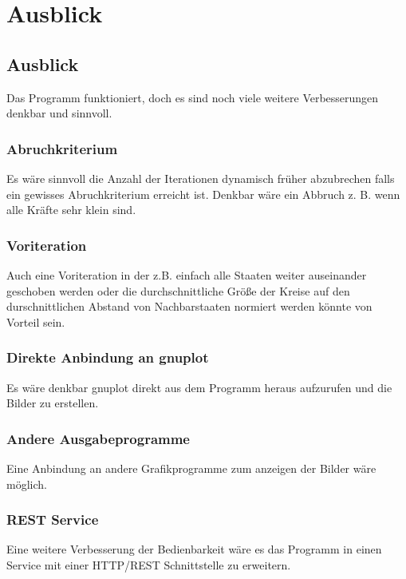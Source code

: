 \chapter{Ausblick}
\label{chap:ZusammenfassungAusblick}

\section{Ausblick}

Das Programm funktioniert, doch es sind noch viele weitere Verbesserungen denkbar und sinnvoll.

\subsection{Abruchkriterium}

Es wäre sinnvoll die Anzahl der Iterationen dynamisch früher abzubrechen falls ein gewisses Abruchkriterium erreicht ist.
Denkbar wäre ein Abbruch z. B. wenn alle Kräfte sehr klein sind.

\subsection{Voriteration}

Auch eine Voriteration in der z.B. einfach alle Staaten weiter auseinander geschoben werden
oder die durchschnittliche Größe der Kreise auf den durschnittlichen Abstand von Nachbarstaaten normiert werden könnte von Vorteil sein.

\subsection{Direkte Anbindung an gnuplot}

Es wäre denkbar gnuplot direkt aus dem Programm heraus aufzurufen und die Bilder zu erstellen.

\subsection{Andere Ausgabeprogramme}

Eine Anbindung an andere Grafikprogramme zum anzeigen der Bilder wäre möglich.

\subsection{REST Service}

Eine weitere Verbesserung der Bedienbarkeit wäre es das Programm in einen Service mit einer HTTP/REST Schnittstelle zu erweitern.
